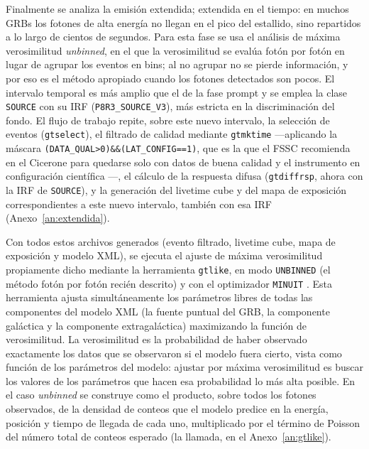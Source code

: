Finalmente se analiza la emisión extendida; extendida en el tiempo: en muchos GRBs los fotones de alta energía no llegan en el pico del estallido, sino repartidos a lo largo de cientos de segundos. Para esta fase se usa el análisis de máxima verosimilitud \textit{unbinned}, en el que la verosimilitud se evalúa fotón por fotón en lugar de agrupar los eventos en bins; al no agrupar no se pierde información, y por eso es el método apropiado cuando los fotones detectados son pocos. El intervalo temporal es más amplio que el de la fase prompt y se emplea la clase \texttt{SOURCE} con su IRF (\texttt{P8R3\_SOURCE\_V3}), más estricta en la discriminación del fondo. El flujo de trabajo repite, sobre este nuevo intervalo, la selección de eventos (\texttt{gtselect}), el filtrado de calidad mediante \texttt{gtmktime} —aplicando la máscara \texttt{(DATA\_QUAL>0)\&\&(LAT\_CONFIG==1)}, que es la que el FSSC recomienda en el Cicerone para quedarse solo con datos de buena calidad y el instrumento en configuración científica \cite{FSSCCicerone}—, el cálculo de la respuesta difusa (\texttt{gtdiffrsp}, ahora con la IRF de \texttt{SOURCE}), y la generación del livetime cube y del mapa de exposición correspondientes a este nuevo intervalo, también con esa IRF (Anexo~\ref{an:extendida}).

Con todos estos archivos generados (evento filtrado, livetime cube, mapa de exposición y modelo XML), se ejecuta el ajuste de máxima verosimilitud propiamente dicho mediante la herramienta \texttt{gtlike}, en modo \texttt{UNBINNED} (el método fotón por fotón recién descrito) y con el optimizador \texttt{MINUIT} \cite{James1975}. Esta herramienta ajusta simultáneamente los parámetros libres de todas las componentes del modelo XML (la fuente puntual del GRB, la componente galáctica y la componente extragaláctica) maximizando la función de verosimilitud. La verosimilitud es la probabilidad de haber observado exactamente los datos que se observaron si el modelo fuera cierto, vista como función de los parámetros del modelo: ajustar por máxima verosimilitud es buscar los valores de los parámetros que hacen esa probabilidad lo más alta posible. En el caso \textit{unbinned} se construye como el producto, sobre todos los fotones observados, de la densidad de conteos que el modelo predice en la energía, posición y tiempo de llegada de cada uno, multiplicado por el término de Poisson del número total de conteos esperado \cite{Mattox1996} (la llamada, en el Anexo~\ref{an:gtlike}).

